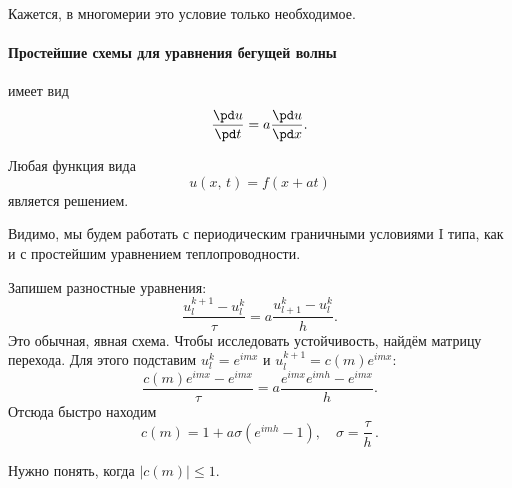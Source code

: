 \documentclass{trlnotes}
\begin{document}
\begin{rem} 
	Кажется, в многомерии это условие только необходимое.
\end{rem}

\paragraph{Простейшие схемы для уравнения бегущей волны}

\begin{de}
	 имеет вид
	\[
		\dfrac{\pd u}{\pd t} = a \dfrac{\pd u}{\pd x}.
	\]
\end{de}

\begin{rem}
	Любая функция вида
	\[
		u(x, \, t) = f(x + at)
	\]
	является решением.
\end{rem}

\begin{rem}
	Видимо, мы будем работать с периодическим граничными условиями I типа, как и с простейшим уравнением теплопроводности.
\end{rem}

Запишем разностные уравнения:
\[
	\dfrac{u^{k + 1}_l - u^k_l}{\tau} = a \dfrac{u^k_{l+1} - u^k_l}{h}.
\]
Это обычная, явная схема. Чтобы исследовать устойчивость, найдём матрицу перехода. Для этого подставим $u_l^k = e^{imx}$ и $u_l^{k + 1} = c(m)e^{imx}$:
\[
	\dfrac{c(m)e^{imx} - e^{imx}}{\tau} = a \dfrac{e^{imx}e^{imh} - e^{imx}}{h}.
\]
Отсюда быстро находим
\begin{equation}\label{eq:wave-trans}
	\boxed{c(m) = 1 + a\sigma(e^{imh} - 1), \quad \sigma = \dfrac{\tau}{h}}\,.
\end{equation}

Нужно понять, когда $\big|c(m)\big| \leqslant 1$.

\end{document}
